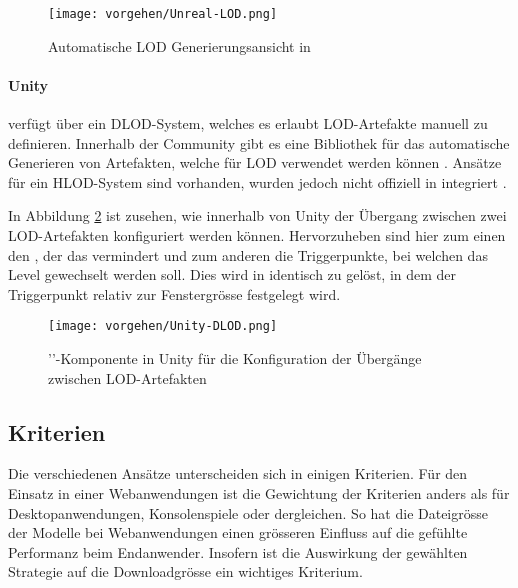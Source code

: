 \begin{figure}[H]
  \centering
  \texttt{[image: vorgehen/Unreal-LOD.png]}
  \caption{Automatische LOD Generierungsansicht in  \cite{unrealAutoLod}}
  \label{fig:unrealLODGeneration}
\end{figure}

\paragraph{Unity}

 verfügt über ein DLOD-System, welches es erlaubt LOD-Artefakte manuell zu definieren.
Innerhalb der  Community gibt es eine Bibliothek für das automatische Generieren von Artefakten, welche für LOD verwendet werden können \cite{unityMeshSimplification}.
Ansätze für ein HLOD-System sind vorhanden, wurden jedoch nicht offiziell in  integriert \cite{unityAutoLod}.

In Abbildung \ref{fig:unityDLODGroup} ist zusehen, wie innerhalb von Unity der Übergang zwischen zwei LOD-Artefakten konfiguriert werden können. Hervorzuheben sind hier zum einen den , der das  vermindert und zum anderen die Triggerpunkte, bei welchen das Level gewechselt werden soll.
Dies wird in  identisch zu  gelöst, in dem der Triggerpunkt relativ zur Fenstergrösse festgelegt wird.

\begin{figure}[H]
  \centering
  \texttt{[image: vorgehen/Unity-DLOD.png]}
  \caption{''-Komponente in Unity für die Konfiguration der Übergänge zwischen LOD-Artefakten}
  \label{fig:unityDLODGroup}
\end{figure}

\subsection{Kriterien}

Die verschiedenen Ansätze unterscheiden sich in einigen Kriterien. Für den Einsatz in einer Webanwendungen ist die Gewichtung der Kriterien anders als für Desktopanwendungen, Konsolenspiele oder dergleichen.
So hat die Dateigrösse der Modelle bei Webanwendungen einen grösseren Einfluss auf die gefühlte Performanz beim Endanwender. Insofern ist die Auswirkung der gewählten Strategie auf die Downloadgrösse ein wichtiges Kriterium.

